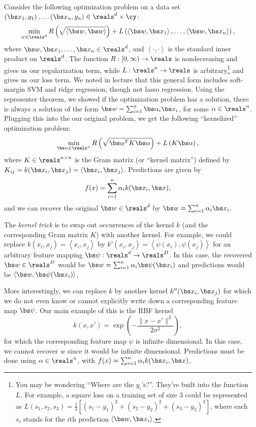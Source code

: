 \documentclass{article}
\theoremstyle{plain}
\theoremstyle{definition}
\begin{document}
Consider the following optimization problem on a data set $\left(\bs x_{1},y_{1}\right),\ldots\left(\bs x_{n},y_{n}\right)\in\reals^{d}\times\cy$:
\[
\min_{w\in\reals^{d}}R\left(\sqrt{\left\langle \bs w,\bs w\right\rangle }\right)+L\left(\left\langle \bs w,\bs x_{1}\right\rangle ,\ldots,\left\langle \bs w,\bs x_{n}\right\rangle \right),
\]
where $\bs w,\bs x_{1},\ldots,\bs x_{n}\in\reals^{d}$, and $\left\langle \cdot,\cdot\right\rangle $
is the standard inner product on $\reals^{d}$. The function $R:[0,\infty)\to\reals$
is nondecreasing and gives us our regularization term, while $L:\reals^{n}\to\reals$ is arbitrary\footnote{You may be wondering ``Where are the $y_{i}$'s?''. They're built
into the function $L$. For example, a square loss on a training set
of size $3$ could be represented as $L(s_{1},s_{2},s_{3})=\frac{1}{3}\left[\left(s_{1}-y_{1}\right)^{2}+\left(s_{2}-y_{2}\right)^{2}+\left(s_{3}-y_{3}\right)^{3}\right]$,
where each $s_{i}$ stands for the $i$th prediction $\left\langle \bs w, \bs x_{i}\right\rangle $. } and gives us our loss term. We noted in lecture that this general
form includes soft-margin SVM and ridge regression, though not lasso
regression. Using the representer theorem, we showed if the optimization
problem has a solution, there is always a solution of the form $\bs w=\sum_{i=1}^{n}\bs \alpha_{i} \bs x_{i}$,
for some $\alpha\in\reals^{n}$. Plugging this into the our original
problem, we get the following ``kernelized'' optimization problem:
\[
\min_{\bs \alpha\in\reals^{n}}R\left(\sqrt{\bs \alpha^{T}K \bs \alpha}\right)+L\left(K\bs \alpha\right),
\]
where $K\in\reals^{n\times n}$ is the Gram matrix (or ``kernel matrix'')
defined by $K_{ij}=k(\bs x_{i},\bs x_{j})=\left\langle \bs x_{i}, \bs x_{j}\right\rangle $.
Predictions are given by
\[
f(x)=\sum_{i=1}^{n} \alpha_{i}k(\bs x_{i}, \bs x),
\]
and we can recover the original $\bs w\in\reals^{d}$ by $\bs w=\sum_{i=1}^{n}\alpha_{i} \bs x_{i}$.

The \emph{kernel trick} is to swap out occurrences of the
kernel $k$ (and the corresponding Gram matrix $K$) with another
kernel. For example, we could replace $k(x_{i},x_{j})=\left\langle x_{i},x_{j}\right\rangle $
by $k'(x_{i},x_{j})=\left\langle \psi(x_{i}),\psi(x_{j})\right\rangle $
for an arbitrary feature mapping $\bs \psi:\reals^{d}\to\reals^{D}$.
In this case, the recovered $\bs w\in\reals^{D}$ would be $\bs w=\sum_{i=1}^{n}\alpha_{i}\bs \psi(\bs x_{i})$
and predictions would be $\left\langle \bs w, \bs\psi(\bs x_{i})\right\rangle $\@.

More interestingly, we can replace $k$ by another kernel $k''(\bs x_{i}, \bs x_{j})$
for which we do not even know or cannot explicitly write down a corresponding
feature map $\bs \psi$. Our main example of this is the RBF kernel
\[
k(x,x')=\exp\left(-\frac{\|x-x'\|^{2}}{2\sigma^{2}}\right),
\]
for which the corresponding feature map $\psi$ is infinite dimensional.
In this case, we cannot recover $w$ since it would be infinite dimensional.
Predictions must be done using $\alpha\in\reals^{n}$, with $f(x)=\sum_{i=1}^{n}\alpha_{i}k(\bs x_{i}, \bs x)$. 
\end{document}
